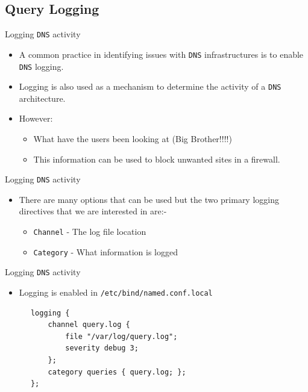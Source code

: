 \documentclass[xcolor=table,aspectratio=169]{beamer}
\begin{document}
\subsection{Query Logging}
\begin{frame}{Logging \texttt{DNS} activity}
  \begin{itemize}
    \item A common practice in identifying issues with \texttt{DNS} infrastructures is to enable \texttt{DNS} logging.
    \item Logging is also used as a mechanism to determine the activity of a \texttt{DNS} architecture.
    \item However:
      \begin{itemize}
        \item What have the users been looking at (Big Brother!!!!)
        \item This information can be used to block unwanted sites in a firewall.
      \end{itemize}
  \end{itemize}
\end{frame}

\begin{frame}{Logging \texttt{DNS} activity}
  \begin{itemize}
    \item There are many options that can be used but the two primary logging directives that we are interested in are:-
      \begin{itemize}
        \item \texttt{Channel} - The log file location
        \item \texttt{Category} - What information is logged
      \end{itemize}
  \end{itemize}
\end{frame}

\begin{frame}[fragile]{Logging \texttt{DNS} activity}
  \begin{itemize}
    \item Logging is enabled in \texttt{/etc/bind/named.conf.local}
  \end{itemize}
  \begin{tcolorbox}
    \lstset{
      basicstyle=\tiny\ttfamily,
    }
    \begin{lstlisting}
      logging {
	      channel query.log {
	          file "/var/log/query.log";
	          severity debug 3;
	      };
	      category queries { query.log; };
      };
    \end{lstlisting}
  \end{tcolorbox}
\end{frame}
\end{document}
